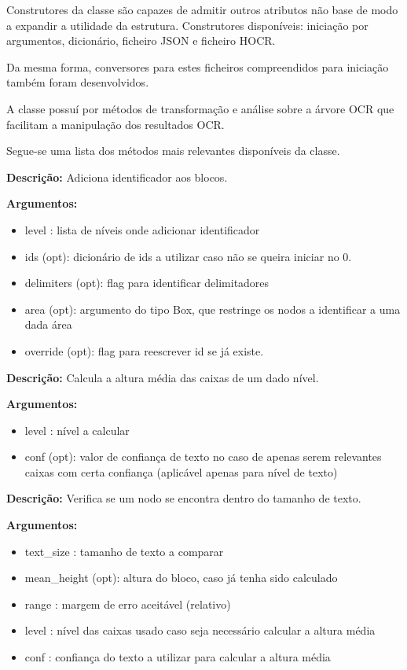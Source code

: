 Construtores da classe são capazes de admitir outros atributos não base de modo a expandir a utilidade da estrutura. Construtores disponíveis: iniciação por argumentos, dicionário, ficheiro JSON e ficheiro HOCR.

Da mesma forma, conversores para estes ficheiros compreendidos para iniciação também foram desenvolvidos.

A classe possuí por métodos de transformação e análise sobre a árvore OCR que facilitam a manipulação dos resultados OCR. 

Segue-se uma lista dos métodos mais relevantes disponíveis da classe.

 
 
\textbf{Descrição:} Adiciona identificador aos blocos.
	
\textbf{Argumentos:}
	\begin{itemize}\setlength\itemsep{-0.3em}
		\vspace{-0.5em}
		\item level : lista de níveis onde adicionar identificador
		\item ids (opt): dicionário de ids a utilizar caso não se queira iniciar no 0.
		\item delimiters (opt): flag para identificar delimitadores
		\item area (opt): argumento do tipo Box, que restringe os nodos a identificar a uma dada área
		\item override (opt): flag para reescrever id se já existe.
	\end{itemize}
				

\textbf{Descrição:} Calcula a altura média das caixas de um dado nível.
	
\textbf{Argumentos:}
\begin{itemize}\setlength\itemsep{-0.3em}
	\vspace{-0.5em}
	\item level : nível a calcular
	\item conf (opt): valor de confiança de texto no caso de apenas serem relevantes caixas com certa confiança (aplicável apenas para nível de texto)
\end{itemize}

	

\textbf{Descrição:} Verifica se um nodo se encontra dentro do tamanho de texto.
	
\textbf{Argumentos:}
\begin{itemize}\setlength\itemsep{-0.3em}
	\vspace{-0.5em}
	\item text\_size : tamanho de texto a comparar
	\item mean\_height (opt): altura do bloco, caso já tenha sido calculado
	\item range : margem de erro aceitável (relativo)
	\item level : nível das caixas usado caso seja necessário calcular a altura média
	\item conf : confiança do texto a utilizar para calcular a altura média
\end{itemize}


